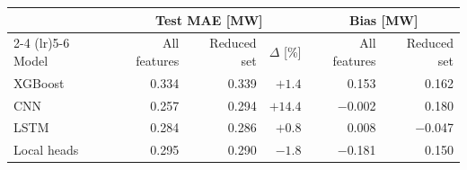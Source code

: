 \begin{tabular}{lrrrrr}
\toprule
 & \multicolumn{3}{c}{Test MAE [MW]} & \multicolumn{2}{c}{Bias [MW]} \\
\cmidrule(lr){2-4} \cmidrule(lr){5-6}
Model & All features & Reduced set & $\Delta$ [\%] & All features & Reduced set \\
\midrule
XGBoost & 0.334 & 0.339 & $+1.4$ & 0.153 & 0.162 \\
CNN & 0.257 & 0.294 & $+14.4$ & $-$0.002 & 0.180 \\
LSTM & 0.284 & 0.286 & $+0.8$ & 0.008 & $-$0.047 \\
Local heads & 0.295 & 0.290 & $-1.8$ & $-$0.181 & 0.150 \\
\bottomrule
\end{tabular}
